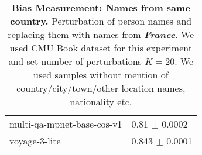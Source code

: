 \begin{table}[h!]
{\begin{tabular}{ll}
           multi-qa-mpnet-base-cos-v1 &                  0.81 $\pm$ 0.0002 \\
                        voyage-3-lite &                 0.843 $\pm$ 0.0001 \\
\bottomrule
\end{tabular}}
\caption{\textbf{Bias Measurement: Names from same country.} Perturbation of person names and replacing them with names from \textit{\textbf{France}}. We used CMU Book dataset for this experiment and set number of perturbations $K{=}20$. We used samples without mention of country/city/town/other location names, nationality etc. \label{tab:same_culture_perturb_France}}
\end{table}


\begin{table}[h!]
\centering
{}
\end{table}
